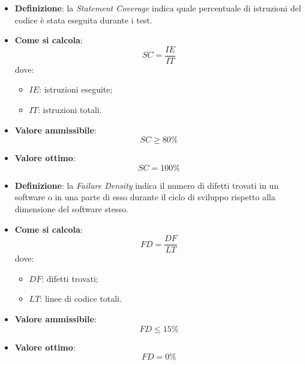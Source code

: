 \hypertarget{28M}{}
\begin{itemize}
	\item \textbf{Definizione}: la \textit{Statement Coverage} indica quale percentuale di istruzioni del codice è stata eseguita durante i test.
	\item \textbf{Come si calcola}: \begin{equation*}SC = \frac{IE}{IT}\end{equation*} dove:
		\begin{itemize}
			\item $IE$: istruzioni eseguite;
			\item $IT$: istruzioni totali.
		\end{itemize}
	\item \textbf{Valore ammissibile}: \begin{equation*}SC \geq 80\%\end{equation*}
	\item \textbf{Valore ottimo}: \begin{equation*}SC = 100\%\end{equation*}
\end{itemize}

\hypertarget{29M}{}
\begin{itemize}
	\item \textbf{Definizione}: la \textit{Failure Density} indica il numero di difetti trovati in un software o in una parte di esso durante il ciclo di sviluppo rispetto alla dimensione del software stesso.
	\item \textbf{Come si calcola}: \begin{equation*}FD = \frac{DF}{LT}\end{equation*} dove:
		\begin{itemize}
			\item $DF$: difetti trovati;
			\item $LT$: linee di codice totali.
		\end{itemize}
	\item \textbf{Valore ammissibile}: \begin{equation*}FD \leq 15\%\end{equation*}
	\item \textbf{Valore ottimo}: \begin{equation*}FD = 0\%\end{equation*}
\end{itemize}

